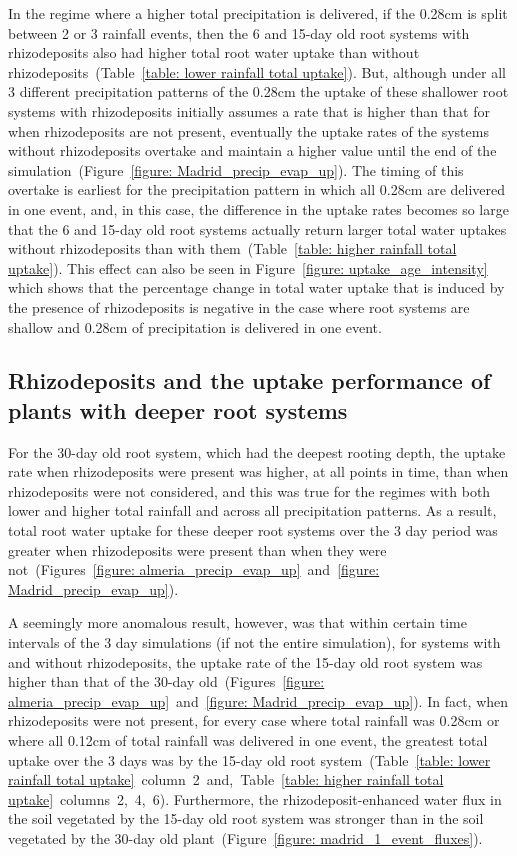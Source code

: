 \documentclass[11pt,a4paper]{article}
\numberwithin{equation}{section}
\begin{document}
In the regime where a higher total precipitation is delivered, if the 0.28cm is split between 2 or 3 rainfall events, then the 6 and 15-day old root systems with rhizodeposits also had higher total root water uptake than without rhizodeposits~(Table~\ref{table: lower rainfall total uptake}). But, although under all 3 different precipitation patterns of the 0.28cm the uptake of these shallower root systems with rhizodeposits initially assumes a rate that is higher than that for when rhizodeposits are not present, eventually the uptake rates of the systems without rhizodeposits overtake and maintain a higher value until the end of the simulation~(Figure~\ref{figure: Madrid_precip_evap_up}). The timing of this overtake is earliest for the precipitation pattern in which all 0.28cm are delivered in one event, and, in this case, the difference in the uptake rates becomes so large that the 6 and 15-day old root systems actually return larger total water uptakes without rhizodeposits than with them~(Table~\ref{table: higher rainfall total uptake}). This effect can also be seen in Figure~\ref{figure: uptake_age_intensity} which shows that the percentage change in total water uptake that is induced by the presence of rhizodeposits is negative in the case where root systems are shallow and 0.28cm of precipitation is delivered in one event.  
 

\subsection{Rhizodeposits and the uptake performance of plants with deeper root systems}
For the 30-day old root system, which had the deepest rooting depth, the uptake rate when rhizodeposits were present was higher, at all points in time, than when rhizodeposits were not considered, and this was true for the regimes with both lower and higher total rainfall and across all precipitation patterns. As a result, total root water uptake for these deeper root systems over the 3 day period was greater when rhizodeposits were present than when they were not~(Figures~\ref{figure: almeria_precip_evap_up}~and~\ref{figure: Madrid_precip_evap_up}). 

A seemingly more anomalous result, however, was that within certain time intervals of the 3 day simulations (if not the entire simulation), for systems with and without rhizodeposits, the uptake rate of the 15-day old root system was higher than that of the 30-day old~(Figures~\ref{figure: almeria_precip_evap_up}~and~\ref{figure: Madrid_precip_evap_up}). In fact, when rhizodeposits were not present, for every case where total rainfall was 0.28cm or where all 0.12cm of total rainfall was delivered in one event, the greatest total uptake over the 3 days was by the 15-day old root system~(Table~\ref{table: lower rainfall total uptake}~column~2~and,~Table~\ref{table: higher rainfall total uptake}~columns~2,~4,~6). Furthermore, the rhizodeposit-enhanced water flux in the soil vegetated by the 15-day old root system was stronger than in the soil vegetated by the 30-day old plant~(Figure~\ref{figure: madrid_1_event_fluxes}).
\end{document}
